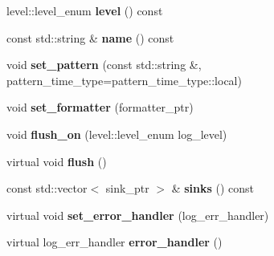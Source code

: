 \begin{DoxyCompactItemize}
\item 
level\+::level\+\_\+enum {\bfseries level} () const \hypertarget{classspdlog_1_1logger_a6fdaf38b46b34772ffa728e8faa3e857}{}\label{classspdlog_1_1logger_a6fdaf38b46b34772ffa728e8faa3e857}

\item 
const std\+::string \& {\bfseries name} () const \hypertarget{classspdlog_1_1logger_a965147f4736d658065f8ba6e923c1c47}{}\label{classspdlog_1_1logger_a965147f4736d658065f8ba6e923c1c47}

\item 
void {\bfseries set\+\_\+pattern} (const std\+::string \&, pattern\+\_\+time\+\_\+type=pattern\+\_\+time\+\_\+type\+::local)\hypertarget{classspdlog_1_1logger_a7fef08e7bfc1369e31f5cf1f0b213be2}{}\label{classspdlog_1_1logger_a7fef08e7bfc1369e31f5cf1f0b213be2}

\item 
void {\bfseries set\+\_\+formatter} (formatter\+\_\+ptr)\hypertarget{classspdlog_1_1logger_a5671bc1118ec7486591e288518b7854f}{}\label{classspdlog_1_1logger_a5671bc1118ec7486591e288518b7854f}

\item 
void {\bfseries flush\+\_\+on} (level\+::level\+\_\+enum log\+\_\+level)\hypertarget{classspdlog_1_1logger_a47c021d339c1f246758e1a87a41668e3}{}\label{classspdlog_1_1logger_a47c021d339c1f246758e1a87a41668e3}

\item 
virtual void {\bfseries flush} ()\hypertarget{classspdlog_1_1logger_a861bb4d4e65de07966148822075bee86}{}\label{classspdlog_1_1logger_a861bb4d4e65de07966148822075bee86}

\item 
const std\+::vector$<$ sink\+\_\+ptr $>$ \& {\bfseries sinks} () const \hypertarget{classspdlog_1_1logger_a59a64487a6c9714d2f7c70b5e094711b}{}\label{classspdlog_1_1logger_a59a64487a6c9714d2f7c70b5e094711b}

\item 
virtual void {\bfseries set\+\_\+error\+\_\+handler} (log\+\_\+err\+\_\+handler)\hypertarget{classspdlog_1_1logger_a7f20aa1910f281f3fd8e477d165ee124}{}\label{classspdlog_1_1logger_a7f20aa1910f281f3fd8e477d165ee124}

\item 
virtual log\+\_\+err\+\_\+handler {\bfseries error\+\_\+handler} ()\hypertarget{classspdlog_1_1logger_a49f6b60692fdaf3adfc13f9831c4bd14}{}\label{classspdlog_1_1logger_a49f6b60692fdaf3adfc13f9831c4bd14}

\end{DoxyCompactItemize}
